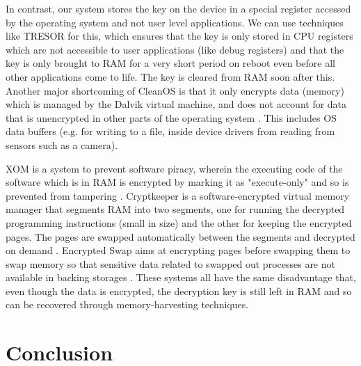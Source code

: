 \documentclass[conference,10pt]{IEEEtran}
\begin{document}
In contrast, our system stores the key on the device in a special register accessed by the operating system 
and not user level applications. We can use techniques like TRESOR \cite{tresor} for this, which ensures 
that the key is only stored in CPU registers which are not accessible to user applications (like debug 
registers) and that the key is only brought to RAM for a very short period on reboot even before all other 
applications come to life. The key is cleared from RAM soon after this.  Another major shortcoming of 
CleanOS is that it only encrypts data (memory) which is managed by the Dalvik virtual machine, and does not 
account for data that is unencrypted in other parts of the operating system \cite{cleanos}.  This includes 
OS data buffers (e.g. for writing to a file, inside device drivers from reading from sensors such as a 
camera).

XOM is a system to prevent software piracy, wherein the executing code of the software which is in RAM is 
encrypted by marking it as "execute-only" and so is prevented from tampering \cite{xom}.  Cryptkeeper is a 
software-encrypted virtual memory manager that segments RAM into two segments, one for running the 
decrypted programming instructions (small in size) and the other for keeping the encrypted pages. The pages 
are swapped automatically between the segments and decrypted on demand \cite{cryptkeeper}.  Encrypted Swap 
aims at encrypting pages before swapping them to swap memory so that sensitive data related to swapped out 
processes are not available in backing storages \cite{encryptedswap}. These systems all have the same 
disadvantage that, even though the data is encrypted, the decryption key is still left in RAM and so can be 
recovered through memory-harvesting techniques.

\section{Conclusion}
\end{document}
